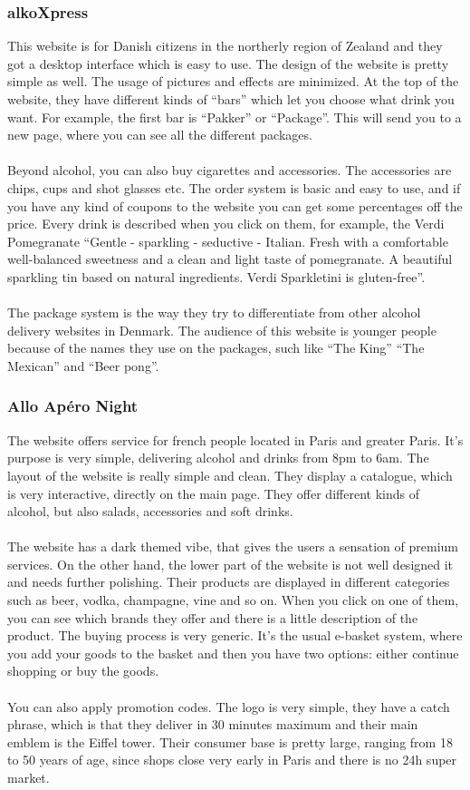 \documentclass[12p]{article}
\begin{document}
\subsubsection{alkoXpress \cite{alkoXpress}}
This website is for Danish citizens in the northerly region of Zealand and they got a desktop interface which is easy to use. The design of the website is pretty simple as well. The usage of pictures and effects are minimized. At the top of the website, they have different kinds of “bars” which let you choose what drink you want. For example, the first bar is “Pakker” or “Package”. This will send you to a new page, where you can see all the different packages. 
\\ \\
Beyond alcohol, you can also buy cigarettes and accessories. The accessories are chips, cups and shot glasses etc. The order system is basic and easy to use, and if you have any kind of coupons to the website you can get some percentages off the price. 
Every drink is described when you click on them, for example, the Verdi Pomegranate 
“Gentle - sparkling - seductive - Italian.
Fresh with a comfortable well-balanced sweetness and a clean and light taste of pomegranate.
A beautiful sparkling tin based on natural ingredients.
Verdi Sparkletini is gluten-free”.
\\ \\
The package system is the way they try to differentiate from other alcohol delivery websites in Denmark. The audience of this website is younger people because of the names they use on the packages, such like “The King” “The Mexican” and “Beer pong”. 
\subsubsection{Allo Apéro Night \cite{alloAperoNight}}
The website offers service for french people located in Paris and greater Paris.
It’s purpose is very simple, delivering alcohol and drinks from 8pm to 6am.
The layout of the website is really simple and clean. They display a catalogue, which is very interactive, directly on the main page. They offer different kinds of alcohol, but also salads, accessories and soft drinks. 
\\ \\
The website has a dark themed vibe, that gives the users a sensation of premium services.
On the other hand, the lower part of the website is not well designed it and needs further polishing.
Their products are displayed in different categories such as beer, vodka, champagne, vine and so on.
When you click on one of them, you can see which brands they offer and there is a little description of the product.
The buying process is very generic. It’s the usual e-basket system, where you add your goods to the basket and then you have two options: either continue shopping or buy the goods.
\\ \\
You can also apply promotion codes.
The logo is very  simple, they have a catch phrase, which is that they deliver in 30 minutes maximum and their main emblem is the Eiffel tower.
Their consumer base is pretty large, ranging from 18 to 50 years of age, since shops close very early in Paris and there is no 24h super market.
\end{document}
